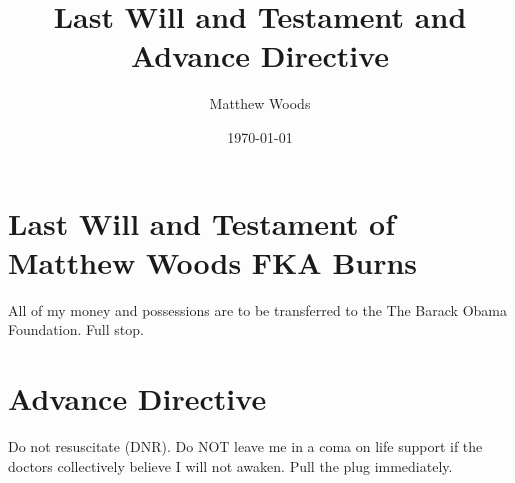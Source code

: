 \documentclass{article}
\title{Last Will and Testament and Advance Directive}
\author{Matthew Woods}
\date{\today}
\begin{document}
\maketitle

\section{Last Will and Testament of Matthew Woods FKA Burns}
All of my money and possessions are to be transferred to the The Barack Obama Foundation. Full stop. 

\section{Advance Directive}
Do not resuscitate (DNR). Do NOT leave me in a coma on life support if the doctors collectively believe I will not awaken. Pull the plug immediately. 
\end{document}
